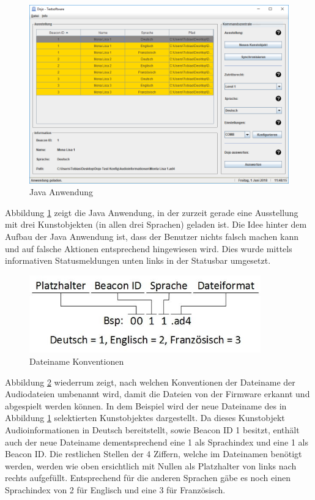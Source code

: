 \begin{figure}[htb]
	\centering
	\includegraphics[width=\textwidth]{graphics/Java_Anwendung.png}
	\caption{Java Anwendung}
	\label{fig:Java Anwendung}
\end{figure}

Abbildung \ref{fig:Java Anwendung} zeigt die Java Anwendung, in der zurzeit gerade eine Ausstellung mit drei Kunstobjekten (in allen drei Sprachen) geladen ist. Die Idee hinter dem Aufbau der Java Anwendung ist, dass der Benutzer nichts falsch machen kann und auf falsche Aktionen entsprechend hingewiesen wird. Dies wurde mittels informativen Statusmeldungen unten links in der Statusbar umgesetzt.

\begin{figure}[htb]
	\centering
	\includegraphics[width=10cm]{graphics/Dateiname_Konvention.jpeg}
	\caption{Dateiname Konventionen}
	\label{fig:Dateiname Konventionen}
\end{figure}

Abbildung \ref{fig:Dateiname Konventionen} wiederrum zeigt, nach welchen Konventionen der Dateiname der Audiodateien umbenannt wird, damit die Dateien von der Firmware erkannt und abgespielt werden können. In dem Beispiel wird der neue Dateiname des in Abbildung \ref{fig:Java Anwendung} selektierten Kunstobjektes dargestellt. Da dieses Kunstobjekt Audioinformationen in Deutsch bereitstellt, sowie Beacon ID 1 besitzt, enthält auch der neue Dateiname dementsprechend eine 1 als Sprachindex und eine 1 als Beacon ID. Die restlichen Stellen der 4 Ziffern, welche im Dateinamen benötigt werden, werden wie oben ersichtlich mit Nullen als Platzhalter von links nach rechts aufgefüllt. Entsprechend für die anderen Sprachen gäbe es noch einen Sprachindex von 2 für Englisch und eine 3 für Französisch.

